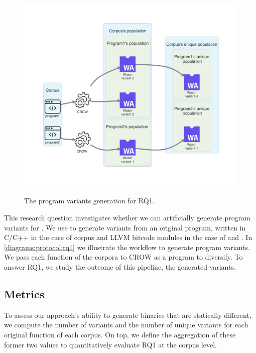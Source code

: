 
\section{\rqone}
\label{rq1:method}


\begin{figure}[h]
    \centering
    \includegraphics[height=4.1in]{diagrams/RQ1.pdf}
    \caption{The program variants generation for RQ1.}
    \label{diagrams:protocol:rq1}
\end{figure}


This research question investigates whether we can artificially generate program variants for \wasm. We use  to generate variants from an original program, written in C/C++ in the case of \corpusrosetta corpus and LLVM bitcode modules in the case of \corpussodium and \corpusqrcode. 
In \autoref{diagrams:protocol:rq1} we illustrate the workflow to generate \wasm program variants. We pass each function of the corpora to CROW as a program to diversify. To answer RQ1, we study the outcome of this pipeline, the generated \wasm variants. 


\subsection*{Metrics}

To assess our approach's ability to generate \wasm binaries that are statically different, we compute the number of variants and the number of unique variants for each original function of each corpus. 
On top, we define the aggregation of these former two values to quantitatively evaluate RQ1 at the corpus level.

